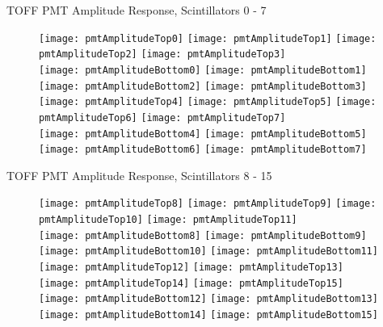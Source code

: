 \documentclass[11pt]{beamer}
\begin{document}
\begin{frame}{TOFF PMT Amplitude Response, Scintillators 0 - 7}
\begin{figure}
\centering
\texttt{[image: pmtAmplitudeTop0]}
\texttt{[image: pmtAmplitudeTop1]}
\texttt{[image: pmtAmplitudeTop2]}
\texttt{[image: pmtAmplitudeTop3]} \\ 
\texttt{[image: pmtAmplitudeBottom0]}
\texttt{[image: pmtAmplitudeBottom1]}
\texttt{[image: pmtAmplitudeBottom2]}
\texttt{[image: pmtAmplitudeBottom3]} \\
\texttt{[image: pmtAmplitudeTop4]}
\texttt{[image: pmtAmplitudeTop5]}
\texttt{[image: pmtAmplitudeTop6]}
\texttt{[image: pmtAmplitudeTop7]} \\
\texttt{[image: pmtAmplitudeBottom4]}
\texttt{[image: pmtAmplitudeBottom5]}
\texttt{[image: pmtAmplitudeBottom6]}
\texttt{[image: pmtAmplitudeBottom7]} \\
\end{figure}
\end{frame}

\begin{frame}{TOFF PMT Amplitude Response, Scintillators 8 - 15}
\begin{figure}
\centering
\texttt{[image: pmtAmplitudeTop8]}
\texttt{[image: pmtAmplitudeTop9]}
\texttt{[image: pmtAmplitudeTop10]}
\texttt{[image: pmtAmplitudeTop11]} \\ 
\texttt{[image: pmtAmplitudeBottom8]}
\texttt{[image: pmtAmplitudeBottom9]}
\texttt{[image: pmtAmplitudeBottom10]}
\texttt{[image: pmtAmplitudeBottom11]} \\
\texttt{[image: pmtAmplitudeTop12]}
\texttt{[image: pmtAmplitudeTop13]}
\texttt{[image: pmtAmplitudeTop14]}
\texttt{[image: pmtAmplitudeTop15]} \\
\texttt{[image: pmtAmplitudeBottom12]}
\texttt{[image: pmtAmplitudeBottom13]}
\texttt{[image: pmtAmplitudeBottom14]}
\texttt{[image: pmtAmplitudeBottom15]} \\
\end{figure}
\end{frame}
\end{document}
